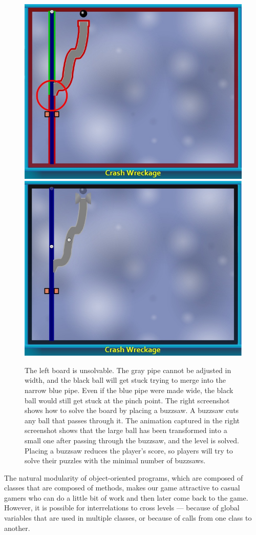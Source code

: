 \documentclass[preprint]{sig-alternate}
\let\Description =\description
\def\Nospacing{\itemsep=0pt\topsep=0pt\partopsep=0pt\parskip=0pt\parsep=0pt}
\renewenvironment{description}{\Description\Nospacing}{\endlist}
\begin{document}
\begin{description}
\end{description}



\begin{figure}
\begin{center}
\includegraphics[width=.49\textwidth]{images/unsolvable-pre-buzzsaw}%
\hfill%
\includegraphics[width=.49\textwidth]{images/unsolvable-post-buzzsaw}
\end{center}

\caption{
  The left board is unsolvable.  The gray pipe cannot be adjusted in width,
  and the black ball will get stuck trying to merge into the narrow blue
  pipe.  Even if the blue pipe were made wide, the black ball would still
  get stuck at the pinch point.
  \newline
  The right screenshot shows how to solve the board by placing a buzzsaw.
  A buzzsaw cuts any ball that passes through it.  The animation captured
  in the right screenshot shows that the large ball has been transformed
  into a small one after passing through the buzzsaw, and the level is
  solved.  Placing a buzzsaw reduces the player's score, so players will
  try to solve their puzzles with the minimal number of buzzsaws.
}
\label{fig:game-buzzsaw}
\end{figure}


The natural modularity of object-oriented programs, which are composed
of classes that are composed of methods, makes our game attractive to
casual gamers who can do a little bit of work and then later come back
to the game.  However, it is possible for interrelations to cross
levels --- because of global variables that are used in multiple
classes, or because of calls from one class to another.
\end{document}
